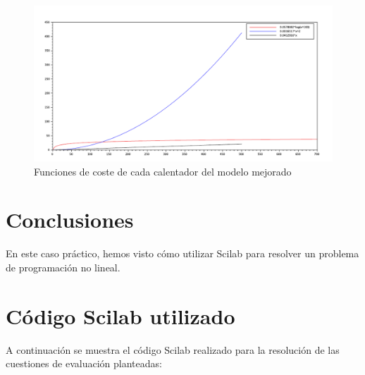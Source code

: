 \documentclass[12pt,a4paper,twoside,openright,titlepage,final]{article}
\begin{document}
\begin{figure}[tbph!]
\centering
\includegraphics[width=0.9\linewidth]{imagenes/funciones}
\caption{Funciones de coste de cada calentador del modelo mejorado}
\label{fig:funciones}
\end{figure}

\section{Conclusiones}

En este caso práctico, hemos visto cómo utilizar Scilab para resolver un problema de programación no lineal.

\clearpage

\section{Código Scilab utilizado}

A continuación se muestra el código Scilab realizado para la resolución de las cuestiones de evaluación planteadas:


\end{document}
